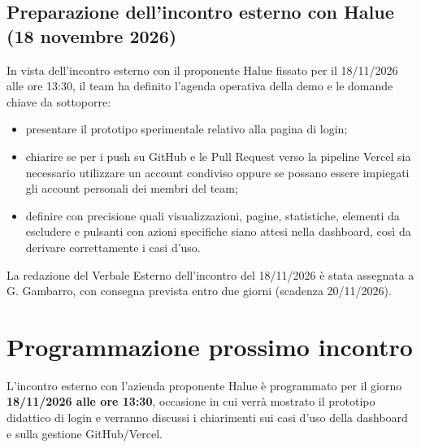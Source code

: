 \subsection{Preparazione dell'incontro esterno con Halue (18 novembre 2026)}
In vista dell'incontro esterno con il proponente Halue fissato per il 18/11/2026 alle ore 13:30, il team ha definito l'agenda operativa della demo e le domande chiave da sottoporre:
\begin{itemize}
    \item presentare il prototipo sperimentale relativo alla pagina di login;
    \item chiarire se per i push su GitHub e le Pull Request verso la pipeline Vercel sia necessario utilizzare un account condiviso oppure se possano essere impiegati gli account personali dei membri del team;
    \item definire con precisione quali visualizzazioni, pagine, statistiche, elementi da escludere e pulsanti con azioni specifiche siano attesi nella dashboard, così da derivare correttamente i casi d'uso.
\end{itemize}
La redazione del Verbale Esterno dell'incontro del 18/11/2026 è stata assegnata a G. Gambarro, con consegna prevista entro due giorni (scadenza 20/11/2026).

\section{Programmazione prossimo incontro}
L'incontro esterno con l'azienda proponente Halue è programmato per il giorno \textbf{18/11/2026 alle ore 13:30}, occasione in cui verrà mostrato il prototipo didattico di login e verranno discussi i chiarimenti sui casi d'uso della dashboard e sulla gestione GitHub/Vercel.

